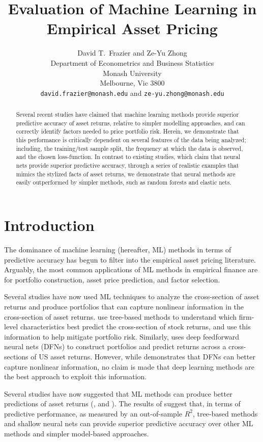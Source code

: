\documentclass{article}
\title{Evaluation of Machine Learning in Empirical Asset Pricing}
\author{%
  David T.~Frazier and Ze-Yu Zhong \\
  Department of Econometrics and Business Statistics\\
  Monash University\\
  Melbourne, Vic 3800 \\
  \texttt{david.frazier@monash.edu} and \texttt{ze-yu.zhong@monash.edu} \\
}
\begin{document}
\maketitle

\begin{abstract}
	Several recent studies have claimed that machine learning methods provide superior predictive accuracy of asset returns, relative to simpler modelling approaches, and can correctly identify factors needed to price portfolio risk. Herein, we demonstrate that this performance is critically dependent on several features of the data being analyzed; including, the training/test sample split, the frequency at which the data is observed, and the chosen loss-function. In contrast to existing studies, which claim that neural nets provide superior predictive accuracy, through a series of realistic examples that mimics the stylized facts of asset returns, we demonstrate that neural methods are easily outperformed by simpler methods, such as random forests and elastic nets.
\end{abstract}

\section{Introduction}
The dominance of machine learning (hereafter, ML) methods in terms of predictive accuracy has begun to filter into the empirical asset pricing literature. Arguably, the most common applications of ML methods in empirical finance are for portfolio construction, asset price prediction, and factor selection. 

Several studies have now used ML techniques to analyze the cross-section of asset returns and produce portfolios that can capture nonlinear information in the cross-section of asset returns. \cite{moritz_tree-based_2016} use tree-based methods to understand which firm-level characteristics best predict the cross-section of stock returns, and use this information to help mitigate portfolio risk. Similarly, \cite{messmer_deep_2017} uses deep feedforward neural nets (DFNs) to construct portfolios and predict returns across a cross-sections of US asset returns. However, while \cite{messmer_deep_2017} demonstrates that DFNs can better capture nonlinear information, no claim is made that deep learning methods are the best approach to exploit this information. 

Several studies have now suggested that ML methods can produce better predictions of asset returns (\cite{gu_empirical_2019}, \cite{hsu_finding_2014} and \cite{feng_deep_2018}). The results of \cite{gu_empirical_2019} suggest that, in terms of predictive performance, as measured by an out-of-sample $R^2$,  tree-based methods and shallow neural nets can provide superior predictive accuracy over other ML methods and simpler model-based approaches. %
\end{document}
